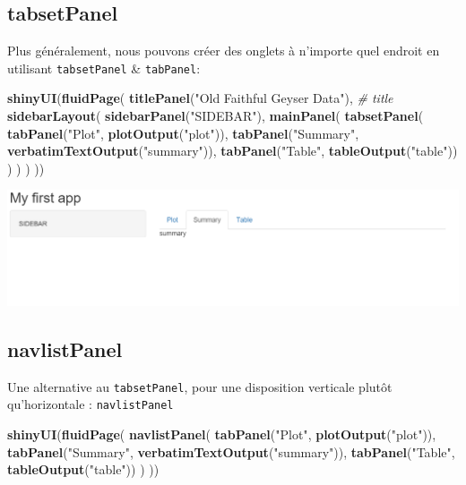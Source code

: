 \documentclass[
]{article}
\newenvironment{Shaded}{\begin{snugshade}}{\end{snugshade}}
\newcommand{\CommentTok}[1]{\textcolor[rgb]{0.56,0.35,0.01}{\textit{#1}}}
\newcommand{\FunctionTok}[1]{\textcolor[rgb]{0.13,0.29,0.53}{\textbf{#1}}}
\newcommand{\NormalTok}[1]{#1}
\newcommand{\StringTok}[1]{\textcolor[rgb]{0.31,0.60,0.02}{#1}}
\begin{document}
\hypertarget{tabsetpanel}{%
\subsection{tabsetPanel}\label{tabsetpanel}}

Plus généralement, nous pouvons créer des onglets à n'importe quel
endroit en utilisant \texttt{tabsetPanel} \& \texttt{tabPanel}:

\begin{Shaded}
\begin{Highlighting}[]
\FunctionTok{shinyUI}\NormalTok{(}\FunctionTok{fluidPage}\NormalTok{(}
  \FunctionTok{titlePanel}\NormalTok{(}\StringTok{"Old Faithful Geyser Data"}\NormalTok{), }\CommentTok{\# title}
  \FunctionTok{sidebarLayout}\NormalTok{(}
    \FunctionTok{sidebarPanel}\NormalTok{(}\StringTok{"SIDEBAR"}\NormalTok{),}
    \FunctionTok{mainPanel}\NormalTok{(}
      \FunctionTok{tabsetPanel}\NormalTok{(}
        \FunctionTok{tabPanel}\NormalTok{(}\StringTok{"Plot"}\NormalTok{, }\FunctionTok{plotOutput}\NormalTok{(}\StringTok{"plot"}\NormalTok{)), }
        \FunctionTok{tabPanel}\NormalTok{(}\StringTok{"Summary"}\NormalTok{, }\FunctionTok{verbatimTextOutput}\NormalTok{(}\StringTok{"summary"}\NormalTok{)), }
        \FunctionTok{tabPanel}\NormalTok{(}\StringTok{"Table"}\NormalTok{, }\FunctionTok{tableOutput}\NormalTok{(}\StringTok{"table"}\NormalTok{))}
\NormalTok{      )}
\NormalTok{    )}
\NormalTok{  )}
\NormalTok{))}
\end{Highlighting}
\end{Shaded}

\includegraphics{img/tabpanel.png}

\hypertarget{navlistpanel}{%
\subsection{navlistPanel}\label{navlistpanel}}

Une alternative au \texttt{tabsetPanel}, pour une disposition verticale
plutôt qu'horizontale : \texttt{navlistPanel}

\begin{Shaded}
\begin{Highlighting}[]
\FunctionTok{shinyUI}\NormalTok{(}\FunctionTok{fluidPage}\NormalTok{(}
  \FunctionTok{navlistPanel}\NormalTok{(}
    \FunctionTok{tabPanel}\NormalTok{(}\StringTok{"Plot"}\NormalTok{, }\FunctionTok{plotOutput}\NormalTok{(}\StringTok{"plot"}\NormalTok{)), }
    \FunctionTok{tabPanel}\NormalTok{(}\StringTok{"Summary"}\NormalTok{, }\FunctionTok{verbatimTextOutput}\NormalTok{(}\StringTok{"summary"}\NormalTok{)), }
    \FunctionTok{tabPanel}\NormalTok{(}\StringTok{"Table"}\NormalTok{, }\FunctionTok{tableOutput}\NormalTok{(}\StringTok{"table"}\NormalTok{))}
\NormalTok{  )}
\NormalTok{))}
\end{Highlighting}
\end{Shaded}
\end{document}
